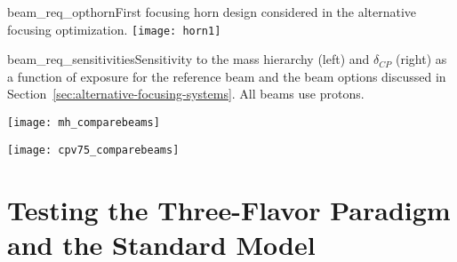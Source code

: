 \begin{cdrfigure}{beam_req_opthorn}{First focusing horn design considered 
    in the alternative focusing optimization. 
}
  \texttt{[image: horn1]}
\end{cdrfigure}

\begin{cdrfigure}
{beam_req_sensitivities}{Sensitivity to the mass hierarchy (left) and
  $\delta_{CP}$ (right) as a function of exposure for the reference beam and
  the beam options discussed in
  Section~\ref{sec:alternative-focusing-systems}.  All beams use  protons.}

\centering 
\begin{minipage}{0.5\textwidth}
\centering 
\texttt{[image: mh\_comparebeams]}
\end{minipage}\hfill 
\begin{minipage}{0.5\textwidth}
\centering 
\texttt{[image: cpv75\_comparebeams]}
\end{minipage} 
\end{cdrfigure}

\section{Testing the Three-Flavor Paradigm and the Standard Model}
\label{sec:physics-lbnosc-3nutests}

